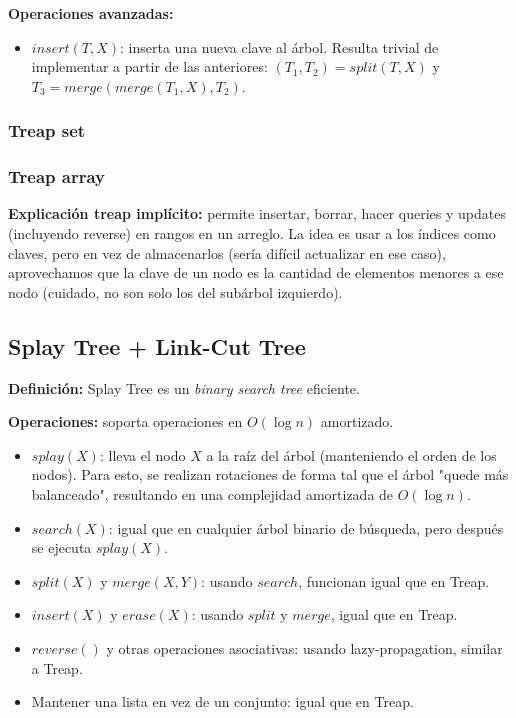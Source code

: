 \textbf{Operaciones avanzadas:}
\begin{itemize}
	\item $insert(T, X)$: inserta una nueva clave al árbol. Resulta trivial de implementar a partir de las anteriores:
	$(T_1, T_2) = split(T, X)$ y $T_3 = merge(merge(T_1, X), T_2)$.
\end{itemize}
\subsubsection{Treap set}
\subsubsection{Treap array}
\textbf{Explicación treap implícito:} permite insertar, borrar, hacer queries y updates (incluyendo reverse) en rangos
en un arreglo. La idea es usar a los índices como claves, pero en vez de almacenarlos (sería difícil actualizar en ese caso),
aprovechamos que la clave de un nodo es la cantidad de elementos menores a ese nodo (cuidado, no son solo los del
subárbol izquierdo).

\subsection{Splay Tree + Link-Cut Tree}
\textbf{Definición:} Splay Tree es un \emph{binary search tree} eficiente.

\textbf{Operaciones:} soporta operaciones en $O(\log{}n)$ amortizado.
\begin{itemize}
    \item $splay(X)$: lleva el nodo $X$ a la raíz del árbol (manteniendo el orden de los nodos). 
    Para esto, se realizan rotaciones de forma tal que el árbol "quede más balanceado", resultando
    en una complejidad amortizada de $O(\log{}n)$.
    \item $search(X)$: igual que en cualquier árbol binario de búsqueda, pero después se ejecuta $splay(X)$.
    \item $split(X)$ y $merge(X, Y)$: usando $search$, funcionan igual que en Treap.
    \item $insert(X)$ y $erase(X)$: usando $split$ y $merge$, igual que en Treap.
    \item $reverse()$ y otras operaciones asociativas: usando lazy-propagation, similar a Treap.
    \item Mantener una lista en vez de un conjunto: igual que en Treap.
\end{itemize}

